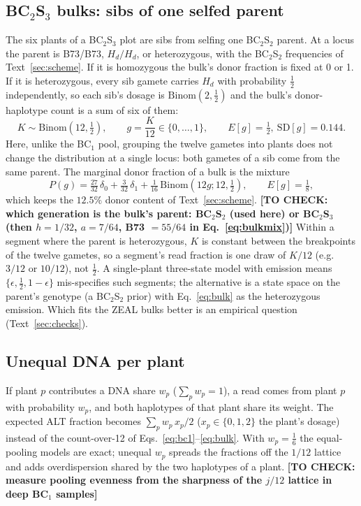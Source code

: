 \documentclass[11pt]{article}
\newcommand{\Bin}{\mathrm{Binom}}
\newcommand{\Hd}{H_d}
\newcommand{\todo}[1]{\textbf{[TO CHECK: #1]}}
\begin{document}
\subsection{BC$_2$S$_3$ bulks: sibs of one selfed parent}
\label{sec:bulk}
The six plants of a BC$_2$S$_3$ plot are sibs from selfing one BC$_2$S$_2$ parent. At a locus the parent is B73/B73, $\Hd/\Hd$, or
heterozygous, with the BC$_2$S$_2$ frequencies of Text~\ref{sec:scheme}. If it is homozygous the bulk's donor fraction is fixed at 0 or 1. If it
is heterozygous, every sib gamete carries $\Hd$ with probability $\tfrac12$ independently, so each sib's dosage is $\Bin(2,\tfrac12)$ and the
bulk's donor-haplotype count is a sum of six of them:
\begin{equation}
K\sim\Bin(12,\tfrac12),\qquad g=\frac{K}{12}\in\{0,\dots,1\},\qquad E[g]=\tfrac12,\ \mathrm{SD}[g]=0.144 .
\label{eq:bulk}
\end{equation}
Here, unlike the BC$_1$ pool, grouping the twelve gametes into plants does not change the distribution at a single locus: both gametes of a
sib come from the same parent. The marginal donor fraction of a bulk is the mixture
\begin{equation}
P(g)=\tfrac{27}{32}\,\delta_0+\tfrac{3}{32}\,\delta_1+\tfrac{1}{16}\,\Bin\!\left(12g;12,\tfrac12\right),\qquad E[g]=\tfrac18 ,
\label{eq:bulkmix}
\end{equation}
which keeps the $12.5\%$ donor content of Text~\ref{sec:scheme}. \todo{which generation is the bulk's parent: BC$_2$S$_2$ (used here) or BC$_2$S$_3$ (then $h=1/32$, $a=7/64$, B73 $=55/64$ in Eq.~\eqref{eq:bulkmix})} Within a segment where the parent is heterozygous, $K$ is constant between
the breakpoints of the twelve gametes, so a segment's read fraction is one draw of $K/12$ (e.g.\ $3/12$ or $10/12$), not $\tfrac12$. A
single-plant three-state model with emission means $\{\epsilon,\tfrac12,1-\epsilon\}$ mis-specifies such segments; the alternative is a
state space on the parent's genotype (a BC$_2$S$_2$ prior) with Eq.~\eqref{eq:bulk} as the heterozygous emission. Which fits the ZEAL
bulks better is an empirical question (Text~\ref{sec:checks}).

\subsection{Unequal DNA per plant}
If plant $p$ contributes a DNA share $w_p$ ($\sum_p w_p=1$), a read comes from plant $p$ with probability $w_p$, and both haplotypes of that
plant share its weight. The expected ALT fraction becomes $\sum_p w_p\,x_p/2$ ($x_p\in\{0,1,2\}$ the plant's dosage) instead of the
count-over-12 of Eqs.~\eqref{eq:bc1}--\eqref{eq:bulk}. With $w_p=\tfrac16$ the equal-pooling models are exact; unequal $w_p$ spreads the
fractions off the $1/12$ lattice and adds overdispersion shared by the two haplotypes of a plant. \todo{measure pooling evenness from the
sharpness of the $j/12$ lattice in deep BC$_1$ samples}
\end{document}

